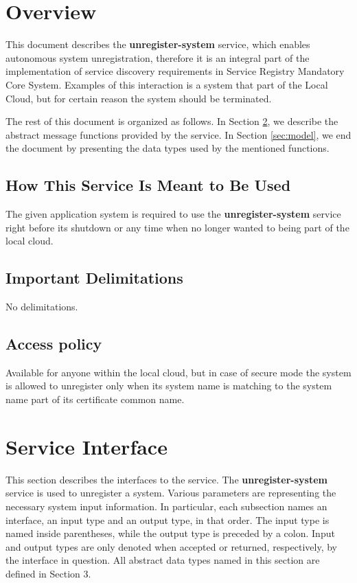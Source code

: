 \documentclass[a4paper]{arrowhead}
\begin{document}
\section{Overview}
\label{sec:overview}
This document describes the \textbf{unregister-system} service, which enables autonomous system unregistration, therefore it is an integral part of the implementation of service discovery requirements in Service Registry Mandatory Core System. Examples of this interaction is a system that part of the Local Cloud, but for certain reason the system should be terminated.

The rest of this document is organized as follows.
In Section \ref{sec:functions}, we describe the abstract message functions provided by the service.
In Section \ref{sec:model}, we end the document by presenting the data types used by the mentioned functions.

\newpage

\subsection{How This Service Is Meant to Be Used}
The given application system is required to use the  \textbf{unregister-system} service right before its shutdown or any time when no longer wanted to being part of the local cloud.

\subsection{Important Delimitations}
\label{sec:delimitations}

No delimitations.

\subsection{Access policy}
\label{sec:accesspolicy}

Available for anyone within the local cloud, but in case of secure mode the system is allowed to unregister only 
when its system name is matching to the system name part of its certificate common name.

\newpage

\section{Service Interface}
\label{sec:functions}

This section describes the interfaces to the service. The \textbf{unregister-system} service is used to unregister a system. Various parameters are representing the necessary system input information.
In particular, each subsection names an interface, an input type and an output type, in that order.
The input type is named inside parentheses, while the output type is preceded by a colon.
Input and output types are only denoted when accepted or returned, respectively, by the interface in question. All abstract data types named in this section are defined in Section 3.
\end{document}
